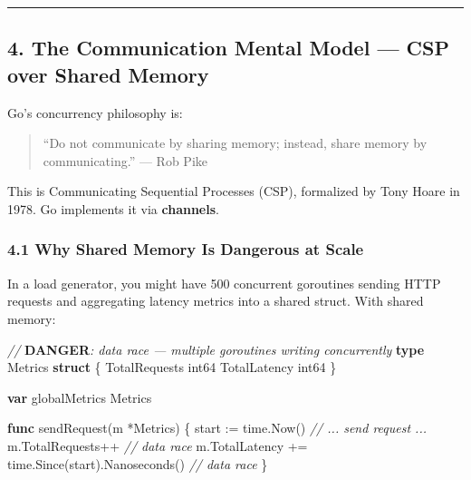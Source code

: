 \documentclass[
]{article}
\newenvironment{Shaded}{}{}
\newcommand{\AlertTok}[1]{\textcolor[rgb]{1.00,0.00,0.00}{\textbf{#1}}}
\newcommand{\CommentTok}[1]{\textcolor[rgb]{0.38,0.63,0.69}{\textit{#1}}}
\newcommand{\DataTypeTok}[1]{\textcolor[rgb]{0.56,0.13,0.00}{#1}}
\newcommand{\KeywordTok}[1]{\textcolor[rgb]{0.00,0.44,0.13}{\textbf{#1}}}
\newcommand{\NormalTok}[1]{#1}
\newcommand{\OperatorTok}[1]{\textcolor[rgb]{0.40,0.40,0.40}{#1}}
\begin{document}
\begin{center}\rule{0.5\linewidth}{0.5pt}\end{center}

\hypertarget{the-communication-mental-model-csp-over-shared-memory}{%
\subsection{4. The Communication Mental Model --- CSP over Shared
Memory}\label{the-communication-mental-model-csp-over-shared-memory}}

Go's concurrency philosophy is:

\begin{quote}
``Do not communicate by sharing memory; instead, share memory by
communicating.'' --- Rob Pike
\end{quote}

This is Communicating Sequential Processes (CSP), formalized by Tony
Hoare in 1978. Go implements it via \textbf{channels}.

\hypertarget{why-shared-memory-is-dangerous-at-scale}{%
\subsubsection{4.1 Why Shared Memory Is Dangerous at
Scale}\label{why-shared-memory-is-dangerous-at-scale}}

In a load generator, you might have 500 concurrent goroutines sending
HTTP requests and aggregating latency metrics into a shared struct. With
shared memory:

\begin{Shaded}
\begin{Highlighting}[]
\CommentTok{// }\AlertTok{DANGER}\CommentTok{: data race — multiple goroutines writing concurrently}
\KeywordTok{type}\NormalTok{ Metrics }\KeywordTok{struct} \OperatorTok{\{}
\NormalTok{    TotalRequests }\DataTypeTok{int64}
\NormalTok{    TotalLatency  }\DataTypeTok{int64}
\OperatorTok{\}}

\KeywordTok{var}\NormalTok{ globalMetrics Metrics}

\KeywordTok{func}\NormalTok{ sendRequest}\OperatorTok{(}\NormalTok{m }\OperatorTok{*}\NormalTok{Metrics}\OperatorTok{)} \OperatorTok{\{}
\NormalTok{    start }\OperatorTok{:=}\NormalTok{ time}\OperatorTok{.}\NormalTok{Now}\OperatorTok{()}
    \CommentTok{// ... send request ...}
\NormalTok{    m}\OperatorTok{.}\NormalTok{TotalRequests}\OperatorTok{++}                              \CommentTok{// data race}
\NormalTok{    m}\OperatorTok{.}\NormalTok{TotalLatency }\OperatorTok{+=}\NormalTok{ time}\OperatorTok{.}\NormalTok{Since}\OperatorTok{(}\NormalTok{start}\OperatorTok{).}\NormalTok{Nanoseconds}\OperatorTok{()} \CommentTok{// data race}
\OperatorTok{\}}
\end{Highlighting}
\end{Shaded}
\end{document}
